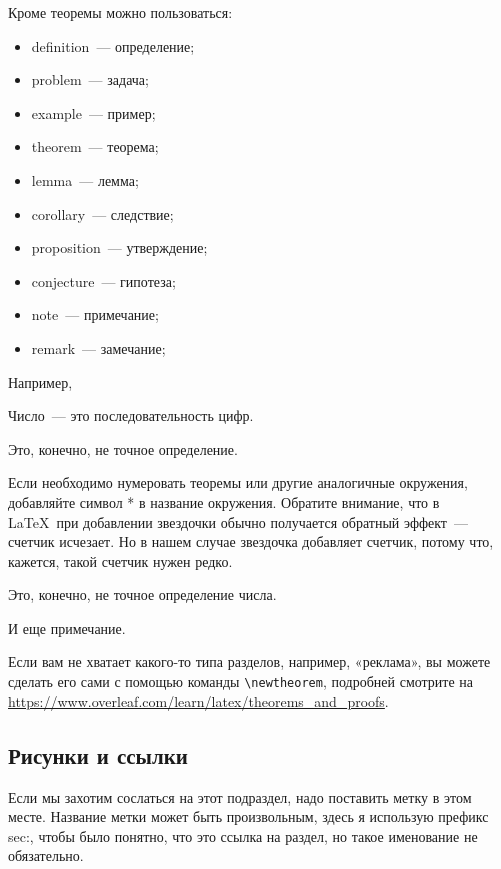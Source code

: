 \documentclass[russian]{lecture-notes}
\begin{document}
Кроме теоремы можно пользоваться:
\begin{itemize}
    \item definition~--- определение;
    \item problem~--- задача;
    \item example~--- пример;
    \item theorem~--- теорема;
    \item lemma~--- лемма;
    \item corollary~--- следствие;
    \item proposition~--- утверждение;
    \item conjecture~--- гипотеза;
    \item note~--- примечание;
    \item remark~--- замечание;
\end{itemize}

Например,

\begin{definition} Число~--- это последовательность цифр.
\end{definition}

\begin{remark}
Это, конечно, не точное определение.
\end{remark}

Если необходимо нумеровать теоремы или другие аналогичные окружения, добавляйте символ *
в название окружения. Обратите внимание, что в \LaTeX\ при добавлении звездочки обычно
получается обратный эффект~--- счетчик исчезает. Но в нашем случае звездочка добавляет
счетчик, потому что, кажется, такой счетчик нужен редко.

\begin{note*}
    Это, конечно, не точное определение числа.
\end{note*}
\begin{note*}
    И еще примечание.
\end{note*}

Если вам не хватает какого-то типа разделов, например, «реклама», вы можете сделать его
сами с помощью команды \verb|\newtheorem|, подробней смотрите на
\url{https://www.overleaf.com/learn/latex/theorems_and_proofs}.

\subsection{Рисунки и ссылки}
Если мы захотим сослаться на этот подраздел, надо поставить метку в этом месте.
Название метки может быть произвольным, здесь я использую префикс sec:, чтобы
было понятно, что это ссылка на раздел, но такое именование не обязательно.
\label{sec:images-and-refs}
\end{document}
